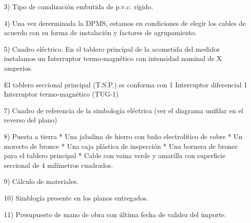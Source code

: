 3) Tipo de canalización embutida de p.v.c. rígido.

4) Una vez dererminada la DPMS, estamos en condiciones de elegir los cables de acuerdo
con su forma de instalación y factores de agrupamiento.

5) Cuadro eléctrico. 
En el tablero principal de la acometida del medidor instalamos un
Interruptor termo-magnético con intensidad nominal de X amperios.

El tablero seccional principal (T.S.P.) se conforma con
1 Interruptor diferencial
1 Interruptor termo-magnético (TUG-1)

7) Cuadro de referencia de la simbología eléctrica (ver el diagrama unifilar en el reverso del plano)

8) Puesta a tierra
* Una jabalina de hierro con baño electrolítico de cobre
* Un morceto de bronce
* Una caja plástica de inspección
* Una bornera de bronce para el tablero principal
* Cable con vaina verde y amarilla con superficie seccional de 4 milímetros cuadrados.

9) Cálculo de materiales.

10) Simblogía presente en los planos entregados.

11) Presupuesto de mano de obra con última fecha de validez del importe.






